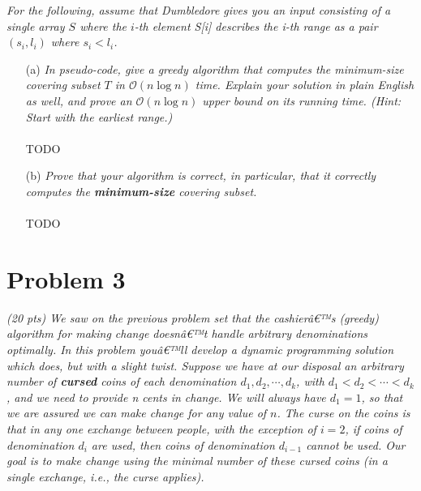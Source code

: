 \documentclass[12pt]{article}
\begin{document}
\textit{For the following, assume that Dumbledore gives you an input consisting of a single
array $S$ where the $i$-th element S[i] describes the i-th range as a pair $(s_i, l_i)$ where $s_i < l_i$.}


\begin{enumerate}
\item[(a)]\textit{In pseudo-code, give a greedy algorithm that computes the minimum-size covering
subset $T$ in $\mathcal{O}(n \log n)$ time. Explain your solution in plain English as well, and
prove an $\mathcal{O}(n \log n)$ upper bound on its running time. (Hint: Start with the earliest
range.)}
\\\\
TODO
\\
\item[(b)]\textit{Prove that your algorithm is correct, in particular, that it correctly computes the \textbf{minimum-size} covering subset.}
\\\\
TODO
\\

\end{enumerate}

\newpage

\section*{Problem 3}

\textit{(20 pts) We saw on the previous problem set that the cashierâ€™s (greedy) algorithm
for making change doesnâ€™t handle arbitrary denominations optimally. In this problem
youâ€™ll develop a dynamic programming solution which does, but with a slight twist.
Suppose we have at our disposal an arbitrary number of \textbf{cursed} coins of each denomination $d_1 , d_2, \cdots, d_k$, with $d_1 < d_2 < \cdots < d_k$, and we need to provide n cents in change.
We will always have $d_1 = 1$, so that we are assured we can make change for any value
of $n$. The curse on the coins is that in any one exchange between people, with the
exception of $i = 2$, if coins of denomination $d_i$ are used, then coins of denomination
$d_{i-1}$ cannot be used. Our goal is to make change using the minimal number of these
cursed coins (in a single exchange, i.e., the curse applies).}
\end{document}
